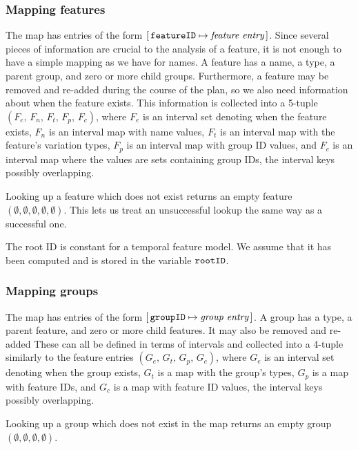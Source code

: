 \subsubsection{Mapping features}
\label{subsub:mapping-features}

The \features{} map has entries of the form $[ \,\texttt{featureID} \mapsto \textit{feature entry}\, ]$. Since several pieces of information are crucial to the analysis of a feature, it is not enough to have a simple mapping as we have for names.
A feature has a name, a type, a parent group, and zero or more child groups. Furthermore, a feature may be removed and re-added during the course of the plan, so we also need information about when the feature exists.
This information is collected into a 5-tuple $(F_e \comma \, F_n \comma \, F_t \comma \, F_p \comma \, F_c)$, where $F_e$ is an interval set denoting when the feature exists, $F_n$ is an interval map with name values, $F_t$ is an interval map with the feature's variation types, $F_p$ is an interval map with group ID values, and $F_c$ is an interval map where the values are sets containing group IDs, the interval keys possibly overlapping.

Looking up a feature which does not exist returns an empty feature $(\emptyset \comma \emptyset \comma \emptyset \comma \emptyset \comma \emptyset)$. This lets us treat an unsuccessful lookup the same way as a successful one.

The root ID is constant for a temporal feature model. We assume that it has been computed and is stored in the variable $\texttt{rootID}$. 

\subsubsection{Mapping groups}
\label{subsub:mapping-groups}

The \groups{} map has entries of the form $[ \,\texttt{groupID} \mapsto \textit{group entry}\, ]$. A group has a type, a parent feature, and zero or more child features. It may also be removed and re-added These can all be defined in terms of intervals and collected into a 4-tuple similarly to the feature entries $(G_e \comma \, G_t  \comma \, G_p \comma \, G_c)$, where $G_e$ is an interval set denoting when the group exists, $G_t$ is a map with the group's types, $G_p$ is a map with feature IDs, and $G_c$ is a map with feature ID values, the interval keys possibly overlapping.

Looking up a group which does not exist in the map returns an empty group $(\emptyset \comma \emptyset \comma \emptyset \comma \emptyset)$. 


